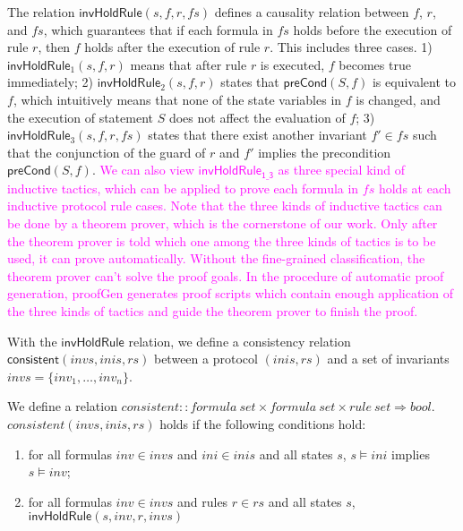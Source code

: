 \documentclass[conference]{IEEEtran}
\newcommand\lyj[1]{\textcolor{magenta}{ #1}}
\begin{document}
The relation $\mathsf{invHoldRule}(s, f,r,fs)$ defines a causality relation
between $f$, $r$, and $fs$, which guarantees that if each formula in $fs$ holds
before the execution of rule $r$, then $f$ holds after the execution of rule $r$. This includes three cases. 1) $\mathsf{invHoldRule}_1(s,f, r)$ means that after rule $r$ is executed, $f$ becomes true immediately;   2) $\mathsf{invHoldRule}_2(s,f, r)$ states that $\mathsf{preCond}(S,f)$ is equivalent to $f$, which intuitively means that none of the state variables in $f$ is changed, and the execution of statement $S$ does not affect the evaluation of $f$;
 3) $\mathsf{invHoldRule}_3(s,f, r,fs)$ states that there exist another invariant $f' \in fs$ such that
  the conjunction of the guard of $r$ and $f'$ implies the precondition  $\mathsf{preCond}(S,f)$.
\lyj{
We can also view $\mathsf{invHoldRule_{1\_3}}$ as three
special kind of inductive tactics, which can be applied to prove
each formula in $fs$ holds at each inductive protocol rule cases. Note that the three kinds of inductive tactics can be done by a theorem prover, which is the cornerstone of our work. Only after the theorem prover is told which one among the three kinds of  tactics is to be used, it can prove automatically. Without the fine-grained classification, the theorem prover can't solve the proof goals. In the procedure of automatic proof generation,  {\sf proofGen}  generates proof scripts which contain enough application of the three kinds of  tactics and guide the theorem prover to finish the proof.}

With the $\mathsf{invHoldRule}$ relation, we define a consistency relation $\mathsf{consistent}( invs,inis, rs)$ between a protocol $(inis,rs)$ and a set of invariants $invs=\{inv_1,\ldots, inv_n\}$.

\begin{definition}
We define a relation $consistent::formula~ set \times formula~ set
\times rule ~set \Rightarrow bool$.
 $consistent( invs,inis, rs)$ holds if the following conditions hold:
\begin{enumerate}
\item for all formulas $inv\in invs$ and $ini\in inis$ and all states $s$,
$s \models ini$ implies $s \models inv$;
\item for all formulas $inv\in invs$ and rules  $r \in rs$ and all states $s$,  $\mathsf{invHoldRule}(s, inv, r, invs   )$
\end{enumerate}
\end{definition}
\end{document}
